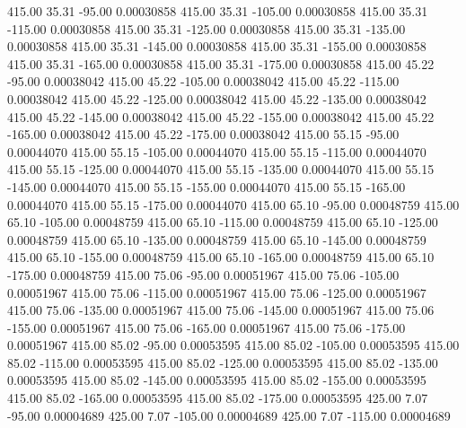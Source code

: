     415.00     35.31    -95.00     0.00030858
    415.00     35.31   -105.00     0.00030858
    415.00     35.31   -115.00     0.00030858
    415.00     35.31   -125.00     0.00030858
    415.00     35.31   -135.00     0.00030858
    415.00     35.31   -145.00     0.00030858
    415.00     35.31   -155.00     0.00030858
    415.00     35.31   -165.00     0.00030858
    415.00     35.31   -175.00     0.00030858
    415.00     45.22    -95.00     0.00038042
    415.00     45.22   -105.00     0.00038042
    415.00     45.22   -115.00     0.00038042
    415.00     45.22   -125.00     0.00038042
    415.00     45.22   -135.00     0.00038042
    415.00     45.22   -145.00     0.00038042
    415.00     45.22   -155.00     0.00038042
    415.00     45.22   -165.00     0.00038042
    415.00     45.22   -175.00     0.00038042
    415.00     55.15    -95.00     0.00044070
    415.00     55.15   -105.00     0.00044070
    415.00     55.15   -115.00     0.00044070
    415.00     55.15   -125.00     0.00044070
    415.00     55.15   -135.00     0.00044070
    415.00     55.15   -145.00     0.00044070
    415.00     55.15   -155.00     0.00044070
    415.00     55.15   -165.00     0.00044070
    415.00     55.15   -175.00     0.00044070
    415.00     65.10    -95.00     0.00048759
    415.00     65.10   -105.00     0.00048759
    415.00     65.10   -115.00     0.00048759
    415.00     65.10   -125.00     0.00048759
    415.00     65.10   -135.00     0.00048759
    415.00     65.10   -145.00     0.00048759
    415.00     65.10   -155.00     0.00048759
    415.00     65.10   -165.00     0.00048759
    415.00     65.10   -175.00     0.00048759
    415.00     75.06    -95.00     0.00051967
    415.00     75.06   -105.00     0.00051967
    415.00     75.06   -115.00     0.00051967
    415.00     75.06   -125.00     0.00051967
    415.00     75.06   -135.00     0.00051967
    415.00     75.06   -145.00     0.00051967
    415.00     75.06   -155.00     0.00051967
    415.00     75.06   -165.00     0.00051967
    415.00     75.06   -175.00     0.00051967
    415.00     85.02    -95.00     0.00053595
    415.00     85.02   -105.00     0.00053595
    415.00     85.02   -115.00     0.00053595
    415.00     85.02   -125.00     0.00053595
    415.00     85.02   -135.00     0.00053595
    415.00     85.02   -145.00     0.00053595
    415.00     85.02   -155.00     0.00053595
    415.00     85.02   -165.00     0.00053595
    415.00     85.02   -175.00     0.00053595
    425.00      7.07    -95.00     0.00004689
    425.00      7.07   -105.00     0.00004689
    425.00      7.07   -115.00     0.00004689
